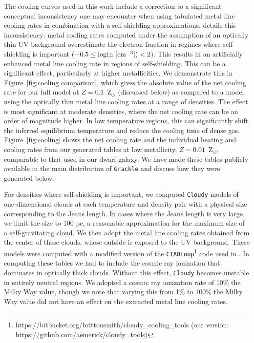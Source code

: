 \documentclass[twocolumn]{aastex61}
\begin{document}
The cooling curves used in this work include a correction to a significant conceptual inconsistency one may encounter when using tabulated metal line cooling rates in combination with a self-shielding approximations. \citet{Hu2017} details this inconsistency: metal cooling rates computed under the assumption of an optically thin UV background overestimate the electron fraction in regimes where self-shielding is important ($-0.5 \leq \rm{log(n~[cm^{-3}])} < 2$). This results in an artificially enhanced metal line cooling rate in regions of self-shielding. This can be a significant effect, particularly at higher metallicities. We demonstrate this in Figure~\ref{fig:cooling comparison}, which gives the absolute value of the net cooling rate for our full model at $Z = 0.1$~Z$_{\odot}$ (discussed below) as compared to a model using the optically thin metal line cooling rates at a range of densities. The effect is most significant at moderate densities, where the net cooling rate can be an order of magnitude higher. In low temperature regions, this can significantly shift the inferred equilibrium temperature and reduce the cooling time of dense gas. Figure~\ref{fig:cooling} shows the net cooling rate and the individual heating and cooling rates from our generated tables at low metallicity, $Z = 0.01$~Z$_{\odot}$, comparable to that used in our dwarf galaxy. We have made these tables publicly available in the main distribution of \texttt{Grackle} and discuss how they were generated below.

For densities where self-shielding is important, we computed \texttt{Cloudy} models of one-dimensional clouds at each temperature and density pair with a physical size corresponding to the Jeans length. In cases where the Jeans length is very large, we limit the size to 100 pc, a reasonable approximation for the maximum size of a self-gravitating cloud. We then adopt the metal line cooling rates obtained from the center of these clouds, whose outside is exposed to the UV background. These models were computed with a modified version of the \texttt{CIAOLoop}\footnote{https://bitbucket.org/brittonsmith/cloudy\_cooling\_tools (our version: https://github.com/aemerick/cloudy\_tools)} code used in \citet{2008MNRAS.385.1443S}. In computing these tables we had to include the cosmic ray ionization that dominates in optically thick clouds. Without this effect, \texttt{Cloudy} becomes unstable in entirely neutral regions. We adopted a cosmic ray ionization rate of 10\% the Milky Way value, though we note that varying this from 1\% to 100\% the Milky Way value did not have an effect on the extracted metal line cooling rates.
\end{document}
